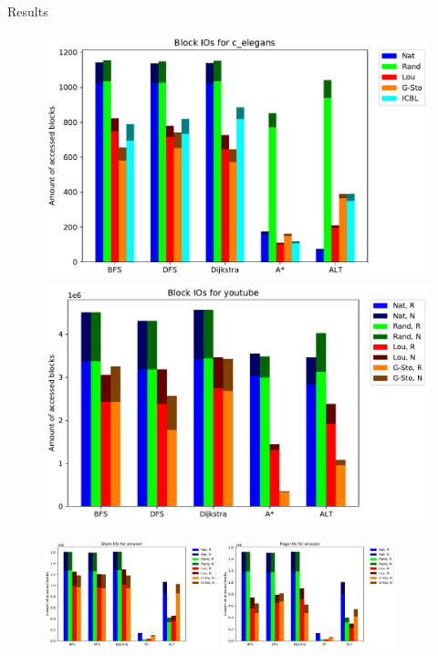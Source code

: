 \documentclass[rgb]{beamer}
\begin{document}
        \begin{frame}[allowframebreaks]{Results}
            \begin{figure}
                \begin{center}
                \includegraphics[keepaspectratio, height=\textheight, width=.45\textwidth]{img/c_elegans_Block_unsorted_io_comparison.pdf} \hfill
                 \includegraphics[keepaspectratio, height=\textheight, width=.45\textwidth]{img/youtube_Block_unsorted_io_comparison.pdf}
                \end{center}
            \end{figure}
            
            \framebreak
            \begin{figure}
                \begin{center}
                \includegraphics[keepaspectratio, height=0.8\textheight, width=0.45\textwidth]{img/amazon_Block_unsorted_io_comparison.pdf} \hfill
                \includegraphics[keepaspectratio, height=0.8\textheight, width=0.45\textwidth]{img/amazon_Page_unsorted_io_comparison.pdf}
                \end{center}
            \end{figure}


\end{frame}
\end{document}

